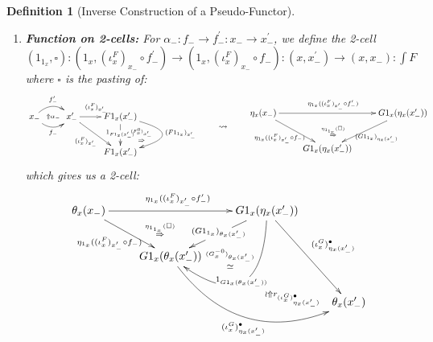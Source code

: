\documentclass{article}
\numberwithin{equation}{section}
\theoremstyle{definition}
\theoremstyle{plain}
\newtheorem{definition}[equation]{Definition}
\begin{document}
\begin{definition}[Inverse Construction of a Pseudo-Functor]
\begin{enumerate}[label = $\bullet$]
\begin{enumerate}
			\item \textbf{Function on 2-cells:} For $\alpha_-: f_- \to f_-^{\prime}: x_- \to x_-^{\prime}$, we define the 2-cell $(1_{1_x},\square): (1_x,(\iota^F_x)_{x_-}\circ f_-^{\prime}) \to (1_x,(\iota^F_x)_{x_-}\circ f_-):(x,x_-^{\prime}) \to (x,x_-):\int F$ where $\square$ is the pasting of:
			\[\vcenter{\xymatrix{
					x_- \ar@/^1pc/[r]^{f_-^{\prime}} \ar@/_1pc/[r]_{f_-} \ar@{}[r]|{\Uparrow\alpha_-} & x_-^{\prime} \ar[dr]_{(\iota^F_x)_{x_-^{\prime}}} \ar[r]^{(\iota^F_x)_{x_-^{\prime}}} & F1_x(x_-^{\prime}) \ar[d]|{1_{F1_x(x_-^{\prime})}} \ar@/^2pc/@{{}{ }{}}[d]|{\overset{(F^0_x)_{x_-^{\prime}}}{\Rightarrow}} \ar@/^4pc/[d]^{(F1_{1_x})_{x_-^{\prime}}}\\
					&& F1_x(x_-^{\prime})
			}}
			\qquad \leadsto \qquad
			\vcenter{\xymatrix{
					\eta_x(x_-) \ar[rr]^{\eta_{1_x}((\iota^F_x)_{x_-^{\prime}}\circ f_-^{\prime})} \ar[dr]_{\eta_{1_x}((\iota^F_x)_{x_-^{\prime}}\circ f_-)} \ar@{}[drr]|{\overset{\eta_{1_{1_x}}(\square)}{\Rightarrow}} && G1_x(\eta_x(x_-^{\prime})) \ar[dl]^{(G1_{1_x})_{\eta_x(x_-^{\prime})}}\\
					& G1_x(\eta_x(x_-^{\prime}))& 
			}}\]
			which gives us a 2-cell:
			\[\xymatrix{
				\theta_x(x_-) \ar[rr]^{\eta_{1_x}((\iota^F_x)_{x_-^{\prime}}\circ f_-^{\prime})} \ar[dr]_{\eta_{1_x}((\iota^F_x)_{x_-^{\prime}}\circ f_-)} \ar@{}[drr]|(0.4){\overset{\eta_{1_{1_x}}(\square)}{\Rightarrow}} && G1_x(\eta_x(x_-^{\prime})) \ar[dl]|{(G1_{1_x})_{\theta_x(x_-^{\prime})}} \ar@/^2pc/@{{}{ }{}}[dl]|{\overset{(G^{-0}_x)_{\theta_x(x_-^{\prime})}}{\simeq}} \ar@/^4pc/[dl]|{1_{G1_x(\theta_x(x_-^{\prime}))}} \ar[ddr]^{(\iota^G_x)^{\bullet}_{\eta_x(x_-^{\prime})}} \\
				& G1_x(\theta_x(x_-^{\prime})) \ar@/_3pc/[drr]_{(\iota^G_x)^{\bullet}_{\eta_x(x_-^{\prime})}} &\\
				&&& \theta_x(x_-^{\prime}) \ar@{{}{ }{}}@/^1pc/[ull]|(0.3){\wr \Uparrow r_{(\iota^G_x)^{\bullet}_{\eta_x(x_-^{\prime})}}}
			}\]
		\end{enumerate}
		

\end{enumerate}
\end{definition}
\end{document}
